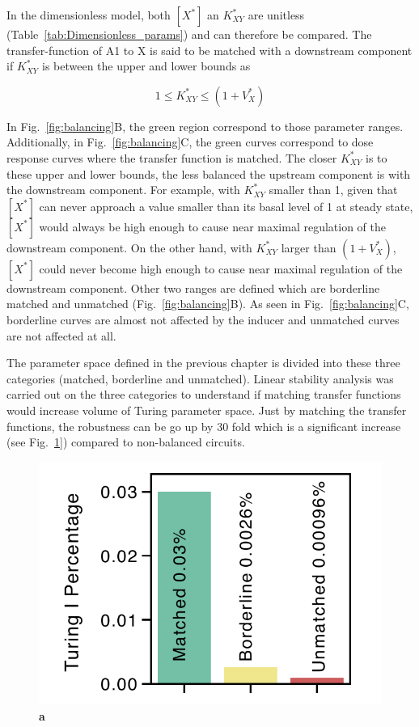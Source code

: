 In the dimensionless model, both $[X^*]$ an $K^*_{XY}$ are unitless (Table~\ref{tab:Dimensionless_params}) and can therefore be compared.
The transfer-function of A1 to X is said to be matched with a downstream component if $K^*_{XY}$ is between the upper and lower bounds as

\begin{equation}
    1 \leq K^*_{XY} \leq (1+V^*_{X})
\end{equation}

In Fig.~\ref{fig:balancing}B, the green region correspond to those parameter ranges.
Additionally, in Fig.~\ref{fig:balancing}C, the green curves correspond to dose response curves where the transfer function is matched.
The closer $K^*_{XY}$ is to these upper and lower bounds, the less balanced the upstream component is with the downstream component.
For example, with $K^*_{XY}$ smaller than 1, given that $[X^*]$ can never approach a value smaller than its basal level of 1 at steady state, $[X^*]$ would always be high enough to cause near maximal regulation of the downstream component.
On the other hand, with $K^*_{XY}$ larger than $(1+V^*_{X})$, $[X^*]$ could never become high enough to cause near maximal regulation of the downstream component.
Other two ranges are defined which are borderline matched and unmatched (Fig.~\ref{fig:balancing}B).
As seen in Fig.~\ref{fig:balancing}C, borderline curves are almost not affected by the inducer and unmatched curves are not affected at all.

The parameter space defined in the previous chapter is divided into these three categories (matched, borderline and unmatched).
Linear stability analysis was carried out on the three categories to understand if matching transfer functions would increase volume of Turing parameter space.
Just by matching the transfer functions, the robustness can be go up by 30 fold which is a significant increase (see Fig.~\ref{fig:balancing_robustness}]) compared to non-balanced circuits.


\begin{figure}[H]
    \centering
    \includegraphics[width=1\textwidth]{chapters/Chapter 2/balancing_robustness}
    \caption[]{\textbf{a} } %
    \label{fig:balancing_robustness}
\end{figure}


